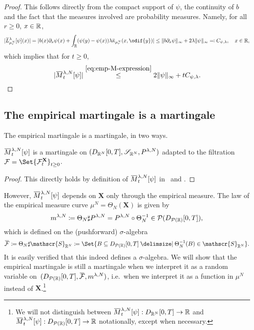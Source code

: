 \begin{proof}
  This follows directly from the compact support of \( \psi \), the continuity of \( b \) and the fact that the measures involved are probability measures.
  Namely, for all \( r \geq 0 \), \( x \in \mathbb{R} \),
  \begin{equation}
    \abs{ \ol{L}_{\mu_{r}^N}^{\lambda} [\psi](x) }
    = \abs{ b(x) \partial_x \psi(x) + \int_\potspace (\psi(y) - \psi(x)) \lambda \ol{\kappa}_{\mu_{r}^N}(x, \odif{y}) }
    \leq \norm{b \partial_x \psi}_\infty + 2 \lambda \norm{\psi}_\infty
    \eqqcolon C_{\psi, \lambda}, \quad x \in \potspace,
  \end{equation}
  which implies that for \( t \geq 0 \),
  \begin{equation}
    \abs{ \ol{M}_t^{\lambda, N}[\psi] }
    \overset{\eqref{eq:emp-M-expression}}{\leq} 2 \norm{\psi}_\infty + t C_{\psi, \lambda}.
  \end{equation}
\end{proof}

\subsection{The empirical martingale is a martingale}

The empirical martingale is a martingale, in two ways.
\begin{corollary}\label{cor:easy-emp-M-mart}
  \(\ol{M}_t^{\lambda,N}[\psi]\) is a martingale on \((D_{\mathbb{R}^N}[0,T], \mathscr{S}_{\mathbb{R}^N}, P^{\lambda, N})\) adapted to the filtration \( \cF = \Set{\cF_t^\bm{X}}_{t\geq0} \).
\end{corollary}
\begin{proof}
  This directly holds by definition of \( \ol{M}_t^{\lambda,N}[\psi] \) in~ and .
\end{proof}

However, \(\ol{M}_t^{\lambda,N}[\psi]\) depends on \( \bm{X} \) only through the empirical measure.
The law of the empirical measure curve \(\mu^N = \Theta_N(\bm{X})\) is given by
\begin{equation}
  m^{\lambda,N} \coloneqq \Theta_N \sharp P^{\lambda, N} = P^{\lambda, N} \circ \Theta_N^{-1} \in \mathcal{P}(D_{\mathcal{P}(\mathbb{R})}[0,T]),
\end{equation}
which is defined on the (pushforward) \( \sigma \)-algebra
\begin{equation}
  \ol{\cF} \coloneqq \Theta_N \sharp \mathscr{S}_{\potspace^N} \coloneqq \Set{B \subseteq D_{\cP(\potspace)}[0,T] \given \Theta_N^{-1}(B) \in \mathscr{S}_{\potspace^N}}.
\end{equation}
It is easily verified that this indeed defines a \( \sigma \)-algebra.
We will show that the empirical martingale is still a martingale when we interpret it as a random variable on~\((D_{\cP(\potspace)}[0,T], \ol{\cF}, \lawmu^{\lambda,N})\), i.e.\ when we interpret it as a function in \(\mu^N\) instead of \(\bm{X}\).\footnote{We will not distinguish between \( \ol{M}_t^{\lambda,N}[\psi] :  D_{\potspace^N}[0,T] \to \bR \) and \( \ol{M}_t^{\lambda,N}[\psi] :  D_{\cP(\potspace)}[0,T] \to \bR \) notationally, except when necessary.}

